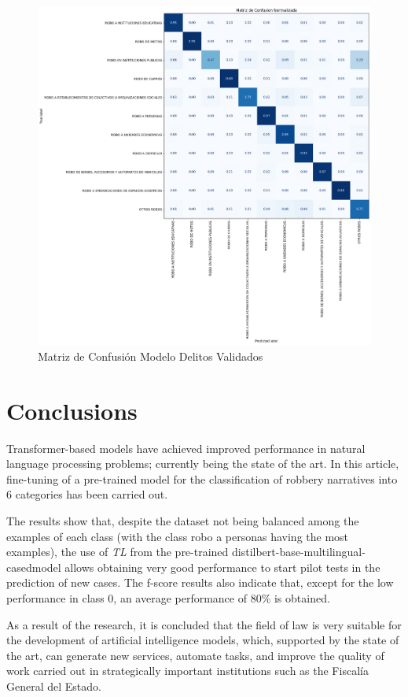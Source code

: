 \documentclass[onecolumn, journal, english, 12pt, a4paper]{IEEEtran} %
\newcommand{\modelohuggingface}{distilbert-base-multilingual-cased}
\theoremstyle{definition}
\begin{document}
\begin{figure}
    \centering
    \includegraphics[width=\textwidth]{imgs/Matriz de Confusion Normalizada DelitosValidados2.png}
    \caption{Matriz de Confusión Modelo Delitos Validados}
    \label{fig:matConfDelitosValidados}
\end{figure}

\section{Conclusions}\label{chap:conclusion}
Transformer-based models have achieved improved performance in natural
language processing problems; currently being the state of the art. In
this article, fine-tuning of a pre-trained model for the
classification of robbery narratives into 6 categories has been
carried out.

The results show that, despite the dataset not being balanced among
the examples of each class (with the class robo a personas having the
most examples), the use of \emph{TL} from the pre-trained
\modelohuggingface model allows obtaining very good performance to
start pilot tests in the prediction of new cases. The f-score results
also indicate that, except for the low performance in class 0, an
average performance of 80\% is obtained.

As a result of the research, it is concluded that the field of law is
very suitable for the development of artificial intelligence models,
which, supported by the state of the art, can generate new services,
automate tasks, and improve the quality of work carried out in
strategically important institutions such as the Fiscalía General del
Estado.
\end{document}
